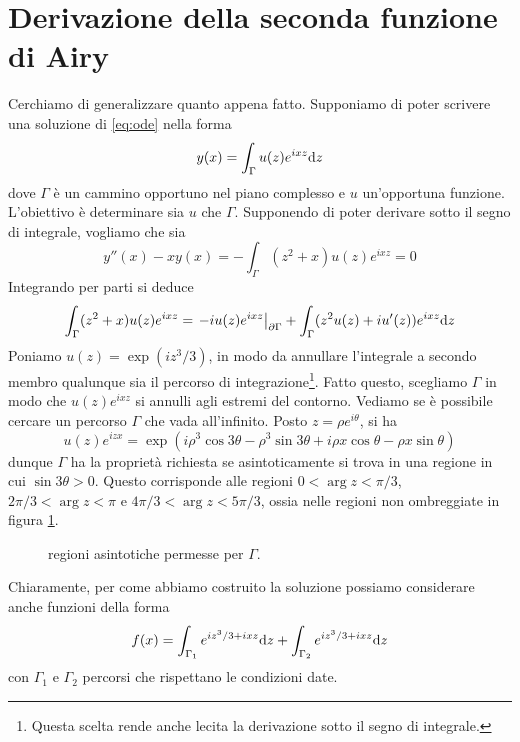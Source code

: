 \documentclass[11 pt]{article}
\begin{document}
	\section{Derivazione della seconda funzione di Airy}
	Cerchiamo di generalizzare quanto appena fatto. Supponiamo di poter scrivere una soluzione di \ref{eq:ode} nella forma
	\[y(x)=\int_{\Gamma}u(z)e^{ixz}\mathrm{d} z\]
	dove $\Gamma$ è un cammino opportuno nel piano complesso e $u$ un'opportuna funzione. L'obiettivo è determinare sia $u$ che $\Gamma$. Supponendo di poter derivare sotto il segno di integrale, vogliamo che sia
	\[y''(x)-xy(x)=-\int_{\Gamma}(z^2+x)u(z)e^{ixz}=0\]
	Integrando per parti si deduce
	\[\int_{\Gamma}(z^2+x)u(z)e^{ixz}=\left.-iu(z)e^{ixz}\right|_{\partial\Gamma}+\int_{\Gamma}(z^2u(z)+iu'(z))e^{ixz}\mathrm{d} z\]
	Poniamo $u(z)=\exp(iz^3/3)$, in modo da annullare l'integrale a secondo membro qualunque sia il percorso di integrazione\footnote{Questa scelta rende anche lecita la derivazione sotto il segno di integrale.}. Fatto questo, scegliamo $\Gamma$ in modo che $u(z)e^{ixz}$ si annulli agli estremi del contorno. Vediamo se è possibile cercare un percorso $\Gamma$ che vada all'infinito. Posto $z=\rho e^{i\theta}$, si ha
	\[u(z)e^{izx}=\exp\left(i\rho^3\cos3\theta-\rho^3\sin3\theta+i\rho x\cos\theta-\rho x\sin\theta\right)\]
	dunque $\Gamma$ ha la proprietà richiesta se asintoticamente si trova in una regione in cui $\sin3\theta>0$. Questo corrisponde alle regioni $0<\arg z<\pi/3$, $2\pi/3<\arg z<\pi$ e $4\pi/3<\arg z<5\pi/3$, ossia nelle regioni non ombreggiate in figura \ref{fig:admreg}.
	\begin{figure}[h!]
		\centering
		\caption{regioni asintotiche permesse per $\Gamma$.}
		\label{fig:admreg}
	\end{figure}

	\noindent Chiaramente, per come abbiamo costruito la soluzione possiamo considerare anche funzioni della forma
	\[f(x)=\int_{\Gamma_1}e^{iz^3/3+ixz}\mathrm{d} z+\int_{\Gamma_2}e^{iz^3/3+ixz}\mathrm{d} z\]
	con $\Gamma_1$ e $\Gamma_2$ percorsi che rispettano le condizioni date.
	
\end{document}
